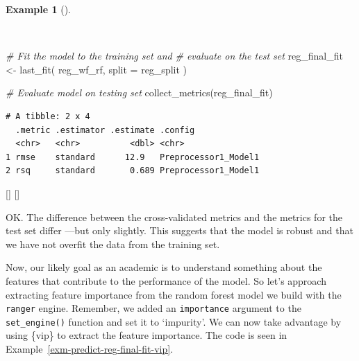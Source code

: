 \documentclass[
  letterpaper,
  krantz1]{latex/krantz-mod}
\newenvironment{Shaded}{\begin{snugshade}}{\end{snugshade}}
\newcommand{\AttributeTok}[1]{\textcolor[rgb]{0.00,0.00,0.00}{#1}}
\newcommand{\CommentTok}[1]{\textcolor[rgb]{0.00,0.00,0.00}{\textit{#1}}}
\newcommand{\FunctionTok}[1]{\textcolor[rgb]{0.00,0.00,0.00}{#1}}
\newcommand{\NormalTok}[1]{\textcolor[rgb]{0.00,0.00,0.00}{#1}}
\newcommand{\OtherTok}[1]{\textcolor[rgb]{0.00,0.00,0.00}{#1}}
\newcommand{\cindex}[1]{%
  \StrSubstitute{#1}{_}{\_}[\temp]%
  \index{\temp}%
}
\theoremstyle{definition}
\theoremstyle{definition}
\newtheorem{example}{Example}[chapter]
\theoremstyle{remark}
\begin{document}
\begin{example}[]\protect\hypertarget{exm-predict-reg-model-spec-random-forest-workflow-tune-fit}{}\label{exm-predict-reg-model-spec-random-forest-workflow-tune-fit}

~

\begin{Shaded}
\begin{Highlighting}[numbers=left,,]
\CommentTok{\# Fit the model to the training set and}
\CommentTok{\# evaluate on the test set}
\NormalTok{reg\_final\_fit }\OtherTok{\textless{}{-}}
  \FunctionTok{last\_fit}\NormalTok{(}
\NormalTok{    reg\_wf\_rf,}
    \AttributeTok{split =}\NormalTok{ reg\_split}
\NormalTok{  )}

\CommentTok{\# Evaluate model on testing set}
\FunctionTok{collect\_metrics}\NormalTok{(reg\_final\_fit)}
\end{Highlighting}
\end{Shaded}

\begin{verbatim}
# A tibble: 2 x 4
  .metric .estimator .estimate .config             
  <chr>   <chr>          <dbl> <chr>               
1 rmse    standard      12.9   Preprocessor1_Model1
2 rsq     standard       0.689 Preprocessor1_Model1
\end{verbatim}

 \cindex{last_fit()}\cindex{collect_metrics()}

\end{example}

OK. The difference between the cross-validated metrics and the metrics
for the test set differ ---but only slightly. This suggests that the
model is robust and that we have not overfit the data from the training
set.

Now, our likely goal as an academic is to understand something about the
features that contribute to the performance of the model. So let's
approach extracting feature importance from
the random forest model we build with the \texttt{ranger} engine.
Remember, we added an \texttt{importance} argument to the
\texttt{set\_engine()} function and set it to `impurity'. We can now
take advantage by using \{vip\} to extract the feature importance. The
code is seen in Example~\ref{exm-predict-reg-final-fit-vip}.
\end{document}
